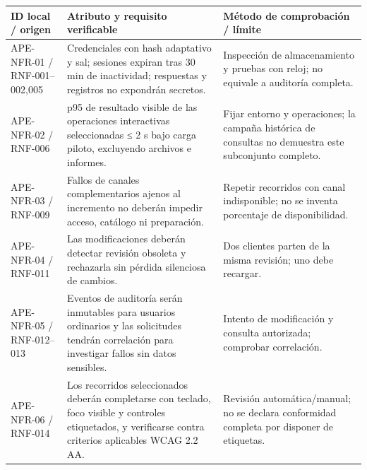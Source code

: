 \documentclass[11pt,a4paper]{article}
\begin{document}
{\def\LTcaptype{none} %
\begin{longtable}[]{@{}
  >{\raggedright\arraybackslash}p{}
  >{\raggedright\arraybackslash}p{}
  >{\raggedright\arraybackslash}p{}@{}}
\toprule\noalign{}
\begin{minipage}[b]{\linewidth}\raggedright
ID local / origen
\end{minipage} & \begin{minipage}[b]{\linewidth}\raggedright
Atributo y requisito verificable
\end{minipage} & \begin{minipage}[b]{\linewidth}\raggedright
Método de comprobación / límite
\end{minipage} \\
\midrule\noalign{}
\endhead
\bottomrule\noalign{}
\endlastfoot
APE-NFR-01 / RNF-001--002,005 & Credenciales con hash adaptativo y sal;
sesiones expiran tras 30 min de inactividad; respuestas y registros no
expondrán secretos. & Inspección de almacenamiento y pruebas con reloj;
no equivale a auditoría completa. \\
APE-NFR-02 / RNF-006 & p95 de resultado visible de las operaciones
interactivas seleccionadas ≤ 2 s bajo carga piloto, excluyendo archivos
e informes. & Fijar entorno y operaciones; la campaña histórica de
consultas no demuestra este subconjunto completo. \\
APE-NFR-03 / RNF-009 & Fallos de canales complementarios ajenos al
incremento no deberán impedir acceso, catálogo ni preparación. & Repetir
recorridos con canal indisponible; no se inventa porcentaje de
disponibilidad. \\
APE-NFR-04 / RNF-011 & Las modificaciones deberán detectar revisión
obsoleta y rechazarla sin pérdida silenciosa de cambios. & Dos clientes
parten de la misma revisión; uno debe recargar. \\
APE-NFR-05 / RNF-012--013 & Eventos de auditoría serán inmutables para
usuarios ordinarios y las solicitudes tendrán correlación para
investigar fallos sin datos sensibles. & Intento de modificación y
consulta autorizada; comprobar correlación. \\
APE-NFR-06 / RNF-014 & Los recorridos seleccionados deberán completarse
con teclado, foco visible y controles etiquetados, y verificarse contra
criterios aplicables WCAG 2.2 AA. & Revisión automática/manual; no se
declara conformidad completa por disponer de etiquetas. \\

\end{longtable}}
\end{document}
